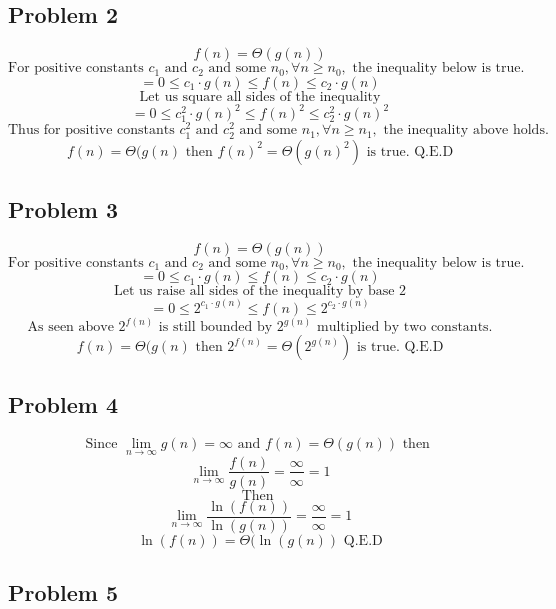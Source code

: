 \documentclass{article}
\begin{document}
\subsection{Problem 2}

$$f(n) = \Theta(g(n)) $$
$$\text{For positive constants } c_1 \text{ and } c_2 \text{ and some } n_0, \forall n \ge n_0, \text{ the inequality below is true.}$$
$$= 0 \le c_1 \cdot g(n) \le f(n) \le c_2 \cdot g(n) $$
$$\text{Let us square all sides of the inequality}$$
$$= 0 \le c_1^2 \cdot g(n)^2 \le f(n)^2 \le c_2^2 \cdot g(n)^2 $$
$$\text{Thus for positive constants } c_{1}^2 \text{ and } c_{2}^2 \text{ and some } n_1, \forall n \ge n_1,\text{ the inequality above holds.}$$
$$f(n) = \Theta(g(n) \text{ then } f(n)^2 = \Theta(g(n)^2) \text{ is true. Q.E.D} $$

\subsection{Problem 3}

$$f(n) = \Theta(g(n)) $$
$$\text{For positive constants } c_1 \text{ and } c_2 \text{ and some } n_0, \forall n \ge n_0, \text{ the inequality below is true.}$$
$$= 0 \le c_1 \cdot g(n) \le f(n) \le c_2 \cdot g(n) $$
$$\text{Let us raise all sides of the inequality by base 2}$$
$$= 0 \le 2^{c_1 \cdot g(n)} \le f(n) \le 2^{c_2 \cdot g(n)} $$
$$\text{As seen above } 2^{f(n)} \text{ is still bounded by } 2^{g(n)} \text{ multiplied by two constants.}$$
$$f(n) = \Theta(g(n) \text{ then } 2^{f(n)} = \Theta(2^{g(n)}) \text{ is true. Q.E.D} $$

\subsection{Problem 4}

$$\text{Since } \lim_{n \rightarrow \infty} g(n) = \infty \text{ and } f(n) = \Theta(g(n)) \text{ then } $$
$$\lim_{n \rightarrow \infty} \frac{f(n)}{g(n)} = \frac{\infty}{\infty} = 1$$
$$\text{Then }$$
$$\lim_{n \rightarrow \infty} \frac{\ln(f(n))}{\ln(g(n))} = \frac{\infty}{\infty} = 1$$
$$\ln(f(n)) = \Theta(\ln(g(n)) \text{ Q.E.D}$$

\subsection{Problem 5}
\end{document}
